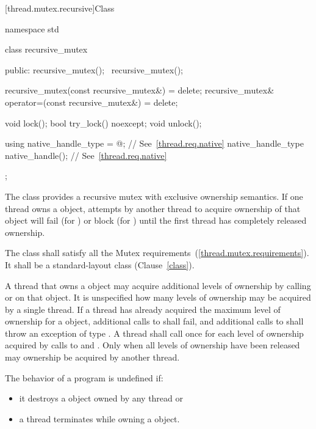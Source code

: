 [thread.mutex.recursive]{Class }

\begin{codeblock}
namespace std {
  class recursive_mutex {
  public:
    recursive_mutex();
    ~recursive_mutex();

    recursive_mutex(const recursive_mutex&) = delete;
    recursive_mutex& operator=(const recursive_mutex&) = delete;

    void lock();
    bool try_lock() noexcept;
    void unlock();

    using native_handle_type = @\impdef@; // See~\ref{thread.req.native}
    native_handle_type native_handle();                // See~\ref{thread.req.native}
  };
}
\end{codeblock}

\pnum
The class  provides a recursive mutex with exclusive ownership
semantics. If one thread owns a  object, attempts by another
thread to acquire ownership of that object will fail (for ) or block
(for ) until the first thread has completely released ownership.

\pnum
The class  shall satisfy all the Mutex
requirements~(\ref{thread.mutex.requirements}). It shall be a standard-layout
class (Clause~\ref{class}).

\pnum
A thread that owns a  object may acquire additional levels of
ownership by calling  or  on that object. It is
unspecified how many levels of ownership may be acquired by a single thread. If a thread
has already acquired the maximum level of ownership for a 
object, additional calls to  shall fail, and additional calls to
 shall throw an exception of type . A thread
shall call  once for each level of ownership acquired by calls to
 and . Only when all levels of ownership have been
released may ownership be acquired by another thread.

\pnum
The behavior of a program is undefined if:

\begin{itemize}
\item it destroys a  object owned by any thread or
\item a thread terminates while owning a  object.
\end{itemize}

